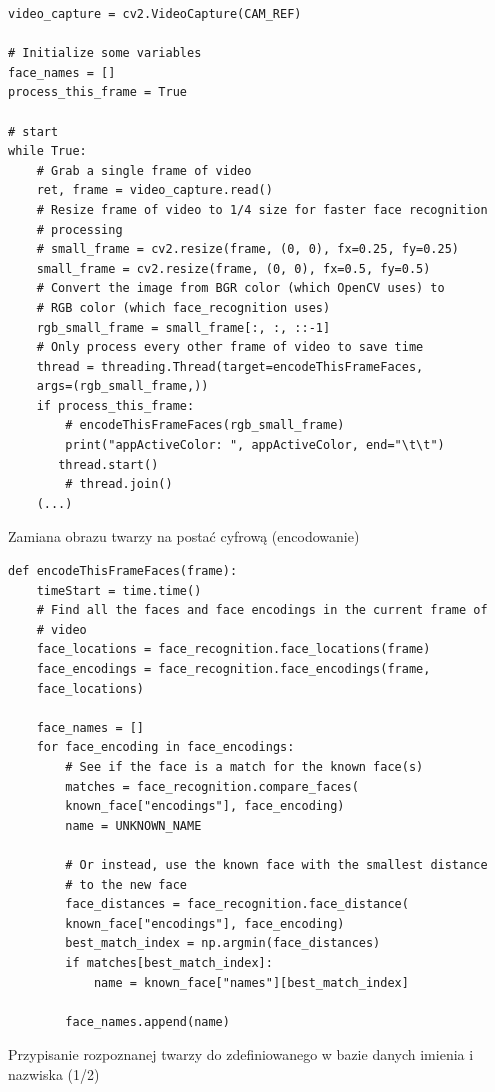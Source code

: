 \documentclass[a4paper,12pt,reqno]{article}
\begin{document}
\begin{listing}[H]%
\begin{mdframed}[backgroundcolor=codebg]
\begin{verbatim}
video_capture = cv2.VideoCapture(CAM_REF)

# Initialize some variables
face_names = []
process_this_frame = True

# start
while True:
    # Grab a single frame of video
    ret, frame = video_capture.read()
    # Resize frame of video to 1/4 size for faster face recognition
    # processing
    # small_frame = cv2.resize(frame, (0, 0), fx=0.25, fy=0.25)
    small_frame = cv2.resize(frame, (0, 0), fx=0.5, fy=0.5)
    # Convert the image from BGR color (which OpenCV uses) to 
    # RGB color (which face_recognition uses)
    rgb_small_frame = small_frame[:, :, ::-1]
    # Only process every other frame of video to save time
    thread = threading.Thread(target=encodeThisFrameFaces, 
    args=(rgb_small_frame,))
    if process_this_frame:
        # encodeThisFrameFaces(rgb_small_frame)
        print("appActiveColor: ", appActiveColor, end="\t\t")
       thread.start()
        # thread.join()
	(...)
\end{verbatim}
\end{mdframed}
\caption{Zamiana obrazu twarzy na postać cyfrową (encodowanie)}
\label{listing:py_camAndStaff}
\end{listing}

\begin{listing}[H]%
\begin{mdframed}[backgroundcolor=codebg]
\begin{verbatim}
def encodeThisFrameFaces(frame):
	timeStart = time.time()
    # Find all the faces and face encodings in the current frame of
    # video
    face_locations = face_recognition.face_locations(frame)
    face_encodings = face_recognition.face_encodings(frame, 
    face_locations)

    face_names = []
    for face_encoding in face_encodings:
        # See if the face is a match for the known face(s)
        matches = face_recognition.compare_faces(
        known_face["encodings"], face_encoding)
        name = UNKNOWN_NAME

        # Or instead, use the known face with the smallest distance
        # to the new face
        face_distances = face_recognition.face_distance(
        known_face["encodings"], face_encoding)
        best_match_index = np.argmin(face_distances)
        if matches[best_match_index]:
            name = known_face["names"][best_match_index]

        face_names.append(name)
\end{verbatim}
\end{mdframed}
\caption{Przypisanie rozpoznanej twarzy do zdefiniowanego w bazie danych imienia i nazwiska (1/2)}
\label{listing:py_encodeThisFrameFaces_1}
\end{listing}
\end{document}
